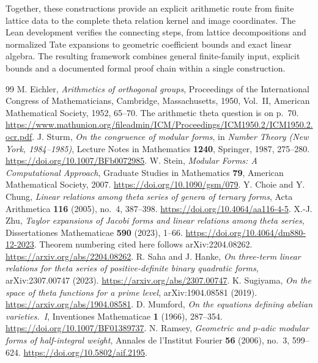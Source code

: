 \documentclass[11pt]{article}
\theoremstyle{remark}\newtheorem{remark}[theorem]{Remark}
\begin{document}
Together, these constructions provide an explicit arithmetic route from
finite lattice data to the complete theta relation kernel and image
coordinates. The Lean development verifies the connecting steps, from
lattice decompositions and normalized Tate expansions to geometric
coefficient bounds and exact linear algebra. The resulting framework
combines general finite-family input, explicit bounds and a documented
formal proof chain within a single construction.

\begin{thebibliography}{99}
\small
{} M. Eichler, \emph{Arithmetics of orthogonal groups},
Proceedings of the International Congress of Mathematicians,
Cambridge, Massachusetts, 1950, Vol.~II, American Mathematical Society,
1952, 65--70. The arithmetic theta question is on p.~70.
\url{https://www.mathunion.org/fileadmin/ICM/Proceedings/ICM1950.2/ICM1950.2.ocr.pdf}.
 J. Sturm, \emph{On the congruence of modular forms},
in \emph{Number Theory (New York, 1984--1985)}, Lecture Notes in Mathematics
\textbf{1240}, Springer, 1987, 275--280.
\url{https://doi.org/10.1007/BFb0072985}.
 W. Stein, \emph{Modular Forms: A Computational Approach},
Graduate Studies in Mathematics \textbf{79}, American Mathematical Society,
2007. \url{https://doi.org/10.1090/gsm/079}.
 Y. Choie and Y. Chung, \emph{Linear relations among
theta series of genera of ternary forms}, Acta Arithmetica
\textbf{116} (2005), no.~4, 387--398.
\url{https://doi.org/10.4064/aa116-4-5}.
 X.-J. Zhu, \emph{Taylor expansions of Jacobi forms and linear
relations among theta series}, Dissertationes Mathematicae \textbf{590}
(2023), 1--66. \url{https://doi.org/10.4064/dm880-12-2023}.
Theorem numbering cited here follows arXiv:2204.08262.
\url{https://arxiv.org/abs/2204.08262}.
 R. Saha and J. Hanke, \emph{On three-term linear
relations for theta series of positive-definite binary quadratic forms},
arXiv:2307.00747 (2023). \url{https://arxiv.org/abs/2307.00747}.
 K. Sugiyama, \emph{On the space of theta functions for
a prime level}, arXiv:1904.08581 (2019).
\url{https://arxiv.org/abs/1904.08581}.
 D. Mumford, \emph{On the equations defining abelian
varieties.~I}, Inventiones Mathematicae \textbf{1} (1966), 287--354.
\url{https://doi.org/10.1007/BF01389737}.
 N. Ramsey, \emph{Geometric and $p$-adic modular forms
of half-integral weight}, Annales de l'Institut Fourier \textbf{56}
(2006), no.~3, 599--624. \url{https://doi.org/10.5802/aif.2195}.

\end{thebibliography}
\end{document}
